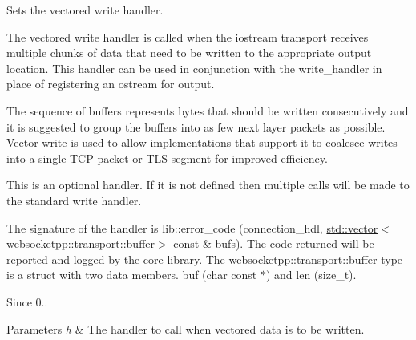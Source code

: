 Sets the vectored write handler. 

The vectored write handler is called when the iostream transport receives multiple chunks of data that need to be written to the appropriate output location. This handler can be used in conjunction with the write\+\_\+handler in place of registering an ostream for output.

The sequence of buffers represents bytes that should be written consecutively and it is suggested to group the buffers into as few next layer packets as possible. Vector write is used to allow implementations that support it to coalesce writes into a single T\+CP packet or T\+LS segment for improved efficiency.

This is an optional handler. If it is not defined then multiple calls will be made to the standard write handler.

The signature of the handler is {\ttfamily lib\+::error\+\_\+code (connection\+\_\+hdl, \mbox{\hyperlink{classstd_1_1vector}{std\+::vector}}$<$\mbox{\hyperlink{structwebsocketpp_1_1transport_1_1buffer}{websocketpp\+::transport\+::buffer}}$>$ const \& bufs)}. The code returned will be reported and logged by the core library. The {\ttfamily \mbox{\hyperlink{structwebsocketpp_1_1transport_1_1buffer}{websocketpp\+::transport\+::buffer}}} type is a struct with two data members. buf (char const $\ast$) and len (size\+\_\+t).

\begin{DoxySince}{Since}
0..
\end{DoxySince}

\begin{DoxyParams}{Parameters}
{\em h} & The handler to call when vectored data is to be written. \\
\hline
\end{DoxyParams}
\mbox{\label{classwebsocketpp_1_1transport_1_1iostream_1_1connection_a32740c33406e5484da7f030fb106ae22}} 
